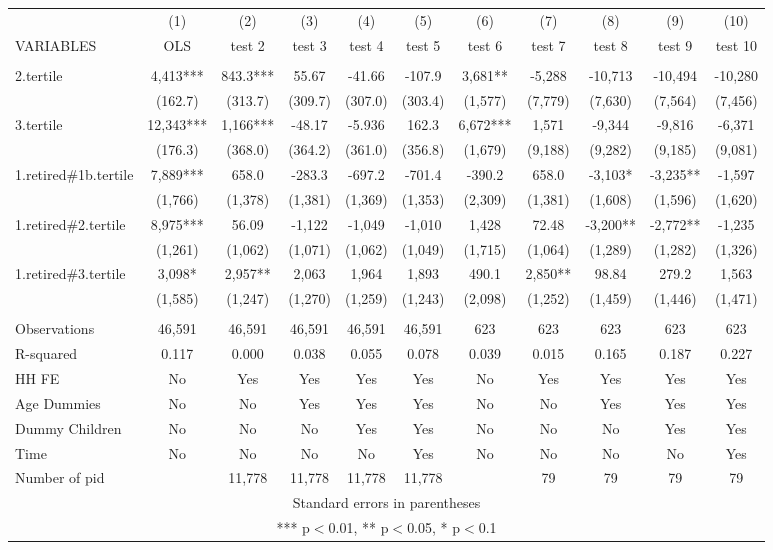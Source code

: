 \begin{tabular}{lcccccccccc} \hline
 & (1) & (2) & (3) & (4) & (5) & (6) & (7) & (8) & (9) & (10) \\
VARIABLES & OLS & test 2 & test 3 & test 4 & test 5 & test 6 & test 7 & test 8 & test 9 & test 10 \\ \hline
 &  &  &  &  &  &  &  &  &  &  \\
2.tertile & 4,413*** & 843.3*** & 55.67 & -41.66 & -107.9 & 3,681** & -5,288 & -10,713 & -10,494 & -10,280 \\
 & (162.7) & (313.7) & (309.7) & (307.0) & (303.4) & (1,577) & (7,779) & (7,630) & (7,564) & (7,456) \\
3.tertile & 12,343*** & 1,166*** & -48.17 & -5.936 & 162.3 & 6,672*** & 1,571 & -9,344 & -9,816 & -6,371 \\
 & (176.3) & (368.0) & (364.2) & (361.0) & (356.8) & (1,679) & (9,188) & (9,282) & (9,185) & (9,081) \\
1.retired\#1b.tertile & 7,889*** & 658.0 & -283.3 & -697.2 & -701.4 & -390.2 & 658.0 & -3,103* & -3,235** & -1,597 \\
 & (1,766) & (1,378) & (1,381) & (1,369) & (1,353) & (2,309) & (1,381) & (1,608) & (1,596) & (1,620) \\
1.retired\#2.tertile & 8,975*** & 56.09 & -1,122 & -1,049 & -1,010 & 1,428 & 72.48 & -3,200** & -2,772** & -1,235 \\
 & (1,261) & (1,062) & (1,071) & (1,062) & (1,049) & (1,715) & (1,064) & (1,289) & (1,282) & (1,326) \\
1.retired\#3.tertile & 3,098* & 2,957** & 2,063 & 1,964 & 1,893 & 490.1 & 2,850** & 98.84 & 279.2 & 1,563 \\
 & (1,585) & (1,247) & (1,270) & (1,259) & (1,243) & (2,098) & (1,252) & (1,459) & (1,446) & (1,471) \\
 &  &  &  &  &  &  &  &  &  &  \\
Observations & 46,591 & 46,591 & 46,591 & 46,591 & 46,591 & 623 & 623 & 623 & 623 & 623 \\
R-squared & 0.117 & 0.000 & 0.038 & 0.055 & 0.078 & 0.039 & 0.015 & 0.165 & 0.187 & 0.227 \\
HH FE & No & Yes & Yes & Yes & Yes & No & Yes & Yes & Yes & Yes \\
Age Dummies & No & No & Yes & Yes & Yes & No & No & Yes & Yes & Yes \\
Dummy Children & No & No & No & Yes & Yes & No & No & No & Yes & Yes \\
Time & No & No & No & No & Yes & No & No & No & No & Yes \\
 Number of pid &  & 11,778 & 11,778 & 11,778 & 11,778 &  & 79 & 79 & 79 & 79 \\ \hline
\multicolumn{11}{c}{ Standard errors in parentheses} \\
\multicolumn{11}{c}{ *** p$<$0.01, ** p$<$0.05, * p$<$0.1} \\
\end{tabular}
